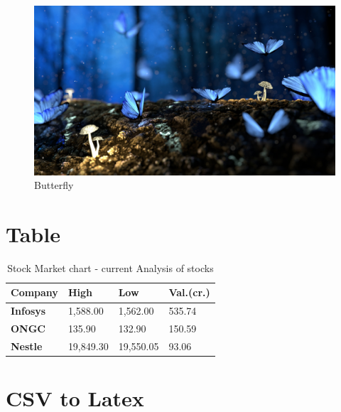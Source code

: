 \documentclass[12pt]{article}
\begin{document}
\begin{figure}[h]
\centering
\includegraphics[scale=0.08]{ButterflyImg}
\caption{Butterfly}
\end{figure}




\newpage
\section{Table}

\begin{table}[h]
\begin{center}
\caption{Stock Market chart - current Analysis of stocks}
\label{tab:table1}

\begin{tabular}{l | l | l | l}
\hline
\textbf{Company} & \textbf{High} & \textbf{Low} & \textbf{Val.(cr.)} \\
\hline
\textbf{Infosys} & 1,588.00 & 1,562.00 & 535.74 \\ \hline
\textbf{ONGC} & 135.90 & 132.90 & 150.59 \\ \hline
\textbf{Nestle} & 19,849.30 & 19,550.05 & 93.06 \\ \hline

\end{tabular}
\end{center}
\end{table}

\newpage
\section{CSV to Latex}

\begin{table}[h]
\begin{center}
\end{center}
\end{table}
\end{document}
